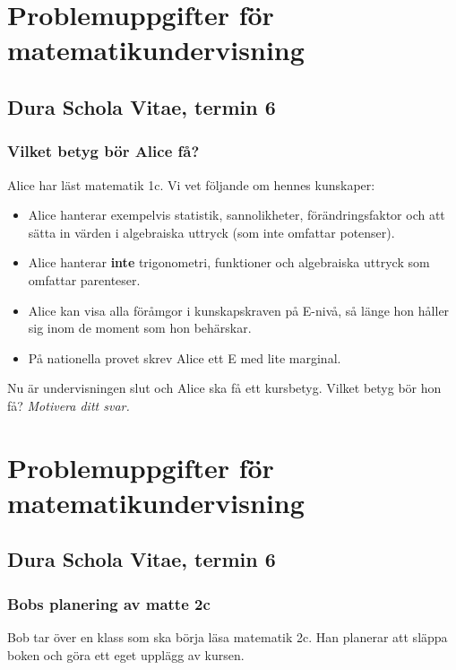 \part*{Problemuppgifter för matematikundervisning}

\chapter{Dura Schola Vitae, termin 6}

\setcounter{section}{0}
\section{Vilket betyg bör Alice få?}
Alice har läst matematik 1c. Vi vet följande om hennes kunskaper:

\begin{itemize}
  \item Alice hanterar exempelvis statistik, sannolikheter, förändringsfaktor och att sätta in värden i algebraiska uttryck (som inte omfattar potenser).
  \item Alice hanterar \textbf{inte} trigonometri, funktioner och algebraiska uttryck som omfattar parenteser.
  \item Alice kan visa alla föråmgor i kunskapskraven på E-nivå, så länge hon håller sig inom de moment som hon behärskar.
  \item På nationella provet skrev Alice ett E med lite marginal.
\end{itemize}

\noindent Nu är undervisningen slut och Alice ska få ett kursbetyg. Vilket betyg bör hon få? \emph{Motivera ditt svar.}



\newpage
\part*{Problemuppgifter för matematikundervisning}

\chapter{Dura Schola Vitae, termin 6}

\section{Bobs planering av matte 2c}
Bob tar över en klass som ska börja läsa matematik 2c. Han planerar att släppa boken och göra ett eget upplägg av kursen.

